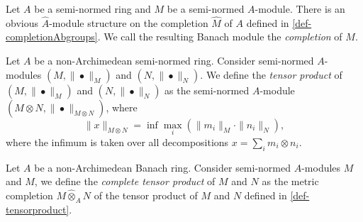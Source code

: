 \begin{definition}
    Let $A$ be a semi-normed ring and $M$ be a semi-normed $A$-module. 
    There is an obvious $\hat{A}$-module structure on the completion $\hat{M}$ of $A$ defined in \cref{def-completionAbgroups}. We call the resulting Banach module the \emph{completion} of $M$.
\end{definition}

\begin{definition}\label{def-tensorproduct}
    Let $A$ be a non-Archimedean semi-normed ring. Consider semi-normed $A$-modules $(M,\|\bullet\|_M)$ and $(N,\|\bullet\|_N)$. We define the \emph{tensor product} of  $(M,\|\bullet\|_M)$ and $(N,\|\bullet\|_N)$ as the semi-normed $A$-module $(M\otimes N,\|\bullet\|_{M\otimes N})$, where
    \[
        \|x\|_{M\otimes N}=\inf \max_i (\|m_i\|_M\cdot \|n_i\|_N),
    \]
    where the infimum is taken over all decompositions $x=\sum_i m_i\otimes n_i$.
\end{definition}

\begin{definition}
    Let $A$ be a non-Archimedean Banach ring. Consider semi-normed $A$-modules $M$ and $M$, we define the \emph{complete tensor product} of $M$ and $N$ as the metric completion $M\hat{\otimes}_A N$ of the tensor product of $M$ and $N$ defined in \cref{def-tensorproduct}.
\end{definition}




